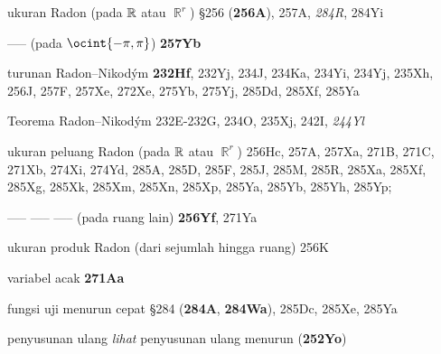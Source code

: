 



{ukuran Radon}
(pada $\Bbb R$ atau $\BbbR^r$)
\S256 ({\bf 256A}), 257A, {\it 284R}, 284Yi 


----- (pada $\ocint{-\pi,\pi}$) {\bf 257Yb}




turunan Radon--Nikod\'ym {\bf 232Hf}, 232Yj,
234J, 234Ka, 234Yi, 234Yj, 235Xh, 256J, 257F, 257Xe,
272Xe, 275Yb, 275Yj,
285Dd, 285Xf, 285Ya


Teorema Radon--Nikod\'ym 232E-232G, 
234O, 235Xj, 242I, {\it 244Yl}


ukuran peluang Radon (pada $\Bbb R$ atau $\BbbR^r$) 256Hc, 257A,
257Xa, 271B, 271C, 271Xb, 274Xi, 274Yd,
285A, 285D, 285F, 285J, 285M, 285R, 285Xa, 285Xf, 285Xg, 285Xk, 285Xm,
285Xn, 285Xp, 285Ya, 285Yb, 285Yh, 285Yp; 


----- ----- ----- (pada ruang lain) {\bf 256Yf}, 271Ya


ukuran produk Radon (dari sejumlah hingga ruang) 256K















variabel acak {\bf 271Aa}














fungsi uji menurun cepat \S284 ({\bf 284A}, {\bf 284Wa}),
285Dc, 285Xe, 285Ya




















penyusunan ulang {\it lihat} penyusunan ulang menurun ({\bf 252Yo})














